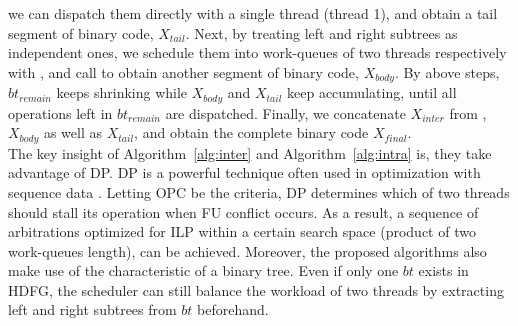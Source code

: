         we can dispatch them directly with a single thread (thread 1), 
        and obtain a tail segment of binary code, $X_{tail}$.
        Next, by treating left and right subtrees as independent ones, 
        we schedule them into work-queues of two threads respectively with ,
        and call  to obtain another segment of binary code, $X_{body}$.
        By above steps, $bt_{remain}$ keeps shrinking while $X_{body}$ and $X_{tail}$ keep accumulating,
        until all operations left in $bt_{remain}$ are dispatched.
        Finally, we concatenate $X_{inter}$ from , $X_{body}$ as well as $X_{tail}$,
        and obtain the complete binary code $X_{final}$.
        \\\indent
        The key insight of Algorithm~\ref{alg:inter} and Algorithm~\ref{alg:intra} is, they take advantage of DP.
        DP is a powerful technique often used in optimization with sequence data \cite{dpseq}.
        Letting OPC be the criteria, DP determines which of two threads should stall its operation when FU conflict occurs.
        As a result, a sequence of arbitrations optimized for ILP within a certain search space (product of two work-queues length), can be achieved.
        Moreover, the proposed algorithms also make use of the characteristic of a binary tree. 
        Even if only one $bt$ exists in HDFG, 
        the scheduler can still balance the workload of two threads by extracting left and right subtrees from $bt$ beforehand.


